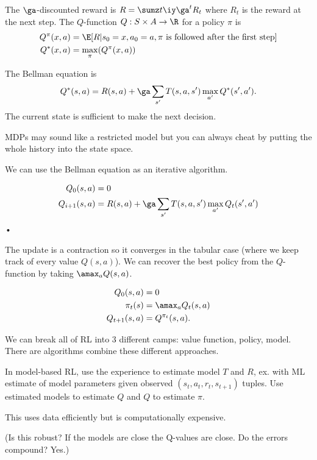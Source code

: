 The $\ga$-discounted reward is $R=\sumz t{\iy} \ga^t R_t$ where $R_t$ is the reward at the next step. The $Q$-function $Q:S\times A\to \R$ for a policy $\pi$ is 
\begin{align}
Q^{\pi}(x,a) &= \E [R | s_0=x, a_0=a, \pi\text{ is followed after the first step}]\\
Q^*(x,a) &= \max_\pi(Q^\pi(x,a))
\end{align}

The Bellman equation is
$$
Q^*(s,a) = R(s,a) + \ga \sum_{s'} T(s,a,s') \max_{a'} Q^*(s',a').
$$
The current state is sufficient to make the next decision.

MDPs may sound like a restricted model but you can always cheat by putting the whole history into the state space.

We can use the Bellman equation as an iterative algorithm.
\begin{alg}
\begin{align}
Q_0(s,a) &= 0\\
Q_{i+1}(s,a) &= R(s,a) + \ga \sum_{s'} T(s,a,s') \max_{a'} Q_t(s',a')
\end{align}•
\end{alg}
The update is a contraction so it converges in the tabular case (where we keep track of every value $Q(s,a)$). We can recover the best policy from the $Q$-function by taking $\amax_a Q(s,a)$.

\begin{alg}
\begin{align}
Q_0(s,a)&=0\\
\pi_t(s) &= \amax_a Q_t(s,a)\\
Q_{t+1}(s,a) &= Q^{\pi_t}(s,a).
\end{align}
\end{alg}

We can break all of RL into 3 different camps: value function, policy, model. There are algorithms combine these different approaches.


In model-based RL, use the experience to estimate model $T$ and $R$, ex. with ML estimate of model parameters given observed $(s_t,a_t,r_t,s_{t+1})$ tuples. Use estimated models to estimate $Q$ and $Q$ to estimate $\pi$.

This uses data efficiently but is computationally expensive.

(Is this robust? If the models are close the Q-values are close. Do the errors compound? Yes.)

